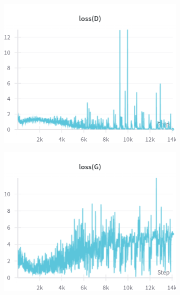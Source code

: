 \begin{figure}[H]
    \centering

    \begin{subfigure}{0.45\textwidth}
        \centering
        \includegraphics[width=0.95\linewidth]{cDCGAN/lossD.png}
        \caption{}
        \label{subfig:cDCGAN/lossD}
    \end{subfigure}%
    \begin{subfigure}{0.45\textwidth}
        \centering
        \includegraphics[width=0.95\linewidth]{cDCGAN/lossG.png}
        \caption{}
        \label{subfig:cDCGAN/lossG}
    \end{subfigure}


\end{figure}
